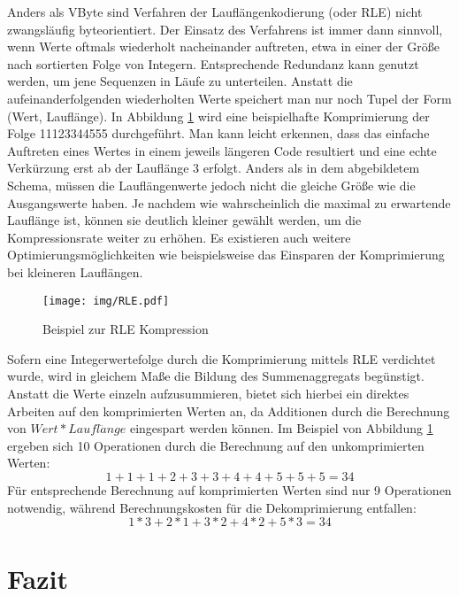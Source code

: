 Anders als VByte sind Verfahren der Lauflängenkodierung \cite{Reghbati1981} (oder \ac{RLE}) nicht zwangsläufig byteorientiert. Der Einsatz des Verfahrens ist immer dann sinnvoll, wenn Werte oftmals wiederholt nacheinander auftreten, etwa in einer der Größe nach sortierten Folge von Integern. Entsprechende Redundanz kann genutzt werden, um jene Sequenzen in Läufe zu unterteilen. Anstatt die aufeinanderfolgenden wiederholten Werte speichert man nur noch Tupel der Form (Wert, Lauflänge). In Abbildung \ref{fig:rle} wird eine beispielhafte Komprimierung der Folge 11123344555 durchgeführt. Man kann leicht erkennen, dass das einfache Auftreten eines Wertes in einem jeweils längeren Code resultiert und eine echte Verkürzung erst ab der Lauflänge 3 erfolgt. Anders als in dem abgebildetem Schema, müssen die Lauflängenwerte jedoch nicht die gleiche Größe wie die Ausgangswerte haben. Je nachdem wie wahrscheinlich die maximal zu erwartende Lauflänge ist, können sie deutlich kleiner gewählt werden, um die Kompressionsrate weiter zu erhöhen. Es existieren auch weitere Optimierungsmöglichkeiten wie beispielsweise das Einsparen der Komprimierung bei kleineren Lauflängen.

\begin{figure}
	\texttt{[image: img/RLE.pdf]}
	\centering
	\caption{Beispiel zur RLE Kompression}
	\label{fig:rle}
\end{figure}

Sofern eine Integerwertefolge durch die Komprimierung mittels \ac{RLE} verdichtet wurde, wird in gleichem Maße die Bildung des Summenaggregats begünstigt. Anstatt die Werte einzeln aufzusummieren, bietet sich hierbei ein direktes Arbeiten auf den komprimierten Werten an, da Additionen durch die Berechnung von $Wert * Laufl\ddot{a}nge$ eingespart werden können. Im Beispiel von Abbildung \ref{fig:rle} ergeben sich 10 Operationen durch die Berechnung auf den unkomprimierten Werten:
\begin{equation*}
	1 + 1 + 1 + 2 + 3 + 3 + 4 + 4 + 5 + 5 + 5 = 34
\end{equation*}
Für entsprechende Berechnung auf komprimierten Werten sind nur 9 Operationen notwendig, während Berechnungskosten für die Dekomprimierung entfallen:
\begin{equation*}
	1 * 3 + 2 * 1 + 3 * 2 + 4 * 2 + 5 * 3 = 34
\end{equation*}

\section{Fazit}

